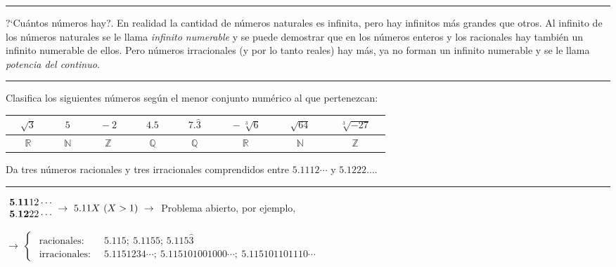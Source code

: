 \vspace{5mm}
\color{teal}
\rule{250pt}{0.1pt}	

?`Cuántos números hay?. En realidad la cantidad de números naturales es infinita, pero hay infinitos más grandes que otros. Al infinito de los números naturales se le llama \emph{infinito numerable} y se puede demostrar que en los números enteros y los racionales hay también un infinito numerable de ellos. Pero números irracionales (y por lo tanto reales) hay más, ya no forman un infinito numerable y se le llama \emph{potencia del continuo}.
\vspace{-5mm}
\begin{flushright}
\rule{250pt}{0.1pt}	
\end{flushright}
\color{black}
\vspace{5mm}

\begin{miejercicio}

Clasifica los siguientes números según el menor conjunto numérico al que pertenezcan:

\begin{table}[H]
\centering
\begin{tabular}{|c|c|c|c|c|c|c|c|}
\hline
$\quad \sqrt{3} \quad$ & $\quad 5 \quad$  & $\quad -2 \quad$ & $\quad 4.5 \quad$ & $\quad 7.\widehat 3 \quad$ & $\quad -\sqrt[3]{6} \quad$ & $\quad \sqrt{64} \quad$ & $\quad \sqrt[3]{-27} \quad$  \\ \hline \hline
$\mathbb{R}$ & $\mathbb{N}$ & $\mathbb{Z}$ & $\mathbb{Q}$ & $\mathbb{Q}$ & $\mathbb{R}$ & $\mathbb{N}$ & $\mathbb{Z}$     \\ \hline
\end{tabular}
\end{table}
\end{miejercicio}

\begin{miejercicio}

Da tres números racionales y tres irracionales comprendidos entre $5.1112\cdots$ y $5.1222....$

\rule{250pt}{0.1pt}

\vspace{3mm}
$\mqty{
\ \bold{5.11}12\cdots \\
\ \bold{5.12}22\cdots 
} \ \to \ 5.11X \ (X>1)\ \to \ $ Problema abierto, por ejemplo,

$\to \ 
\begin{cases}
\text{ racionales: }	\ & 5.115; \ 5.1155;\, 5.115\widehat 3 
\\
\text{ irracionales: } \ & 5.1151234\cdots;\ 5.115101001000\cdots;\ 5.115101101110\cdots
\end{cases}
$
 	
\end{miejercicio}


